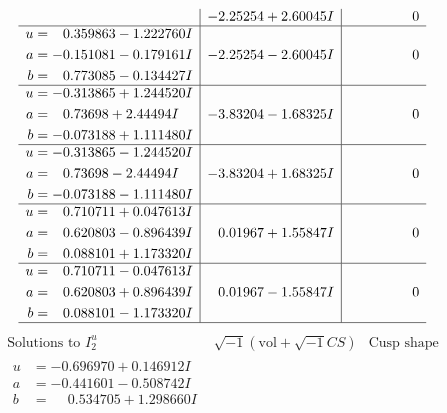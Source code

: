 \documentclass[1p]{elsarticle_modified}
\theoremstyle{definition}
\newcommand{\I}{\sqrt{-1}}
\begin{document}
$$\begin{array}{c|c|c}
 & -2.25254 + 2.60045 I & \phantom{-0.000000 } 0 \\ \hline\begin{aligned}
u &= \phantom{-}0.359863 - 1.222760 I \\
a &= -0.151081 - 0.179161 I \\
b &= \phantom{-}0.773085 - 0.134427 I\end{aligned}
 & -2.25254 - 2.60045 I & \phantom{-0.000000 } 0 \\ \hline\begin{aligned}
u &= -0.313865 + 1.244520 I \\
a &= \phantom{-}0.73698 + 2.44494 I \\
b &= -0.073188 + 1.111480 I\end{aligned}
 & -3.83204 - 1.68325 I & \phantom{-0.000000 } 0 \\ \hline\begin{aligned}
u &= -0.313865 - 1.244520 I \\
a &= \phantom{-}0.73698 - 2.44494 I \\
b &= -0.073188 - 1.111480 I\end{aligned}
 & -3.83204 + 1.68325 I & \phantom{-0.000000 } 0 \\ \hline\begin{aligned}
u &= \phantom{-}0.710711 + 0.047613 I \\
a &= \phantom{-}0.620803 - 0.896439 I \\
b &= \phantom{-}0.088101 + 1.173320 I\end{aligned}
 & \phantom{-}0.01967 + 1.55847 I & \phantom{-0.000000 } 0 \\ \hline\begin{aligned}
u &= \phantom{-}0.710711 - 0.047613 I \\
a &= \phantom{-}0.620803 + 0.896439 I \\
b &= \phantom{-}0.088101 - 1.173320 I\end{aligned}
 & \phantom{-}0.01967 - 1.55847 I & \phantom{-0.000000 } 0\\
 \hline 
 \end{array}$$\newpage$$\begin{array}{c|c|c}  
\text{Solutions to }I^u_{2}& \I (\text{vol} + \sqrt{-1}CS) & \text{Cusp shape}\\
 \hline 
\begin{aligned}
u &= -0.696970 + 0.146912 I \\
a &= -0.441601 - 0.508742 I \\
b &= \phantom{-}0.534705 + 1.298660 I\end{aligned}

\end{array}$$
\end{document}

